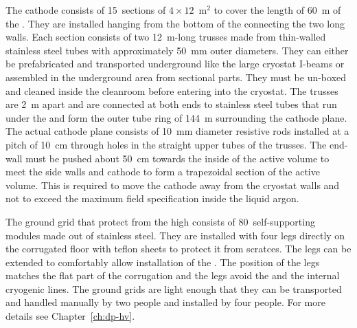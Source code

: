 The cathode consists of 15~sections of $4 \times 12$~m$^2$ to cover the length of 60~m of the  .
They are installed hanging from the bottom of the  connecting the two long walls.
Each section consists of two 12~m-long trusses made from thin-walled stainless steel tubes with approximately 50~mm outer diameters.
They can either be prefabricated and transported underground like the large cryostat I-beams or assembled in the underground area from sectional parts.
They must be un-boxed and cleaned inside the cleanroom before entering into the cryostat.
The trusses are 2~m apart and are connected at both ends to stainless steel tubes that run under the  and form the outer tube ring of 144~m surrounding the cathode plane.
The actual cathode plane consists of 10~mm diameter resistive rods installed at a pitch of 10~cm through holes in the straight upper tubes of the trusses.
The  end-wall must be pushed about 50~cm towards the inside of the active volume to meet the  side walls and cathode to form a trapezoidal section of the active volume.
This is required to move the cathode away from the cryostat walls and not to exceed the maximum field specification inside the liquid argon.

The ground grid that protect  from the high \efield consists of 80~self-supporting modules made out of stainless steel.
They are installed with four legs directly on the corrugated floor with teflon sheets to protect it from scratces.
The legs can be extended to comfortably allow installation of the .
The position of the legs matches the flat part of the corrugation and the legs avoid the  and the internal cryogenic lines.
The ground grids are light enough that they can be transported and handled manually by two people and installed by four people.
For more details see Chapter~\ref{ch:dp-hv}.

